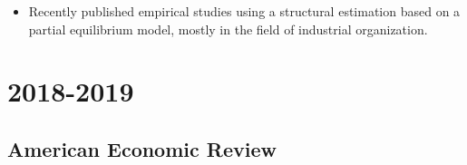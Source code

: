 \documentclass[
]{book}
\providecommand{\tightlist}{%
  \setlength{\itemsep}{0pt}\setlength{\parskip}{0pt}}
\begin{document}
\begin{itemize}
\tightlist
\item
  Recently published empirical studies using a structural estimation based on a partial equilibrium model, mostly in the field of industrial organization.
\end{itemize}

\hypertarget{section}{%
\section{2018-2019}\label{section}}

\hypertarget{american-economic-review}{%
\subsection{American Economic Review}\label{american-economic-review}}
\end{document}
